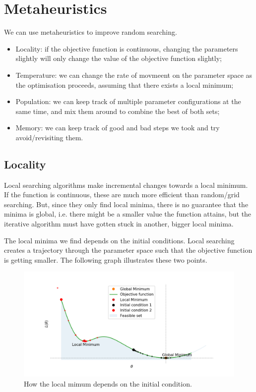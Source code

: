 \documentclass[a4paper, openany]{memoir}
\begin{document}
\section{Metaheuristics}
We can use metaheuristics to improve random searching.
\begin{itemize}
    \item Locality: if the objective function is continuous, changing the parameters slightly will only change the value of the objective function slightly;
    \item Temperature: we can change the rate of movmeent on the parameter space as the optimisation proceeds, assuming that there exists a local minimum;
    \item Population: we can keep track of multiple parameter configurations at the same time, and mix them around to combine the best of both sets;
    \item Memory: we can keep track of good and bad steps we took and try avoid/revisiting them.
\end{itemize}

\subsection{Locality}
Local searching algorithms make incremental changes towards a local minimum. If the function is continuous, these are much more efficient than random/grid searching. But, since they only find local minima, there is no guarantee that the minima is global, i.e. there might be a smaller value the function attains, but the iterative algorithm must have gotten stuck in another, bigger local minima. 

The local minima we find depends on the initial conditions. Local searching creates a trajectory through the parameter space such that the objective function is getting smaller. The following graph illustrates these two points.
\begin{figure}[H]
    \centering
    \includegraphics[scale=0.5]{src/4.16 locality.png}
    \caption{How the local mimum depends on the initial condition.}
\end{figure}
\end{document}
